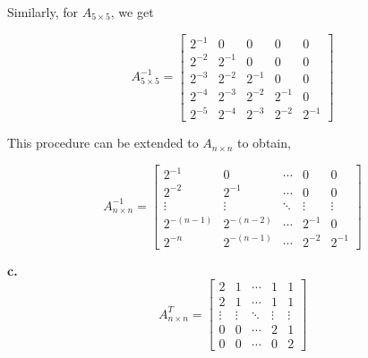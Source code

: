 \documentclass[10pt, twocolumn]{article}
\begin{document}
Similarly, for $A_{5\times 5}$, we get

\[A_{5 \times 5}^{ - 1} = \left[ {\begin{array}{*{20}{c}}
  {{2^{ - 1}}}&0&0&0&0 \\ 
  {{2^{ - 2}}}&{{2^{ - 1}}}&0&0&0 \\ 
  {{2^{ - 3}}}&{{2^{ - 2}}}&{{2^{ - 1}}}&0&0 \\ 
  {{2^{ - 4}}}&{{2^{ - 3}}}&{{2^{ - 2}}}&{{2^{ - 1}}}&0 \\ 
  {{2^{ - 5}}}&{{2^{ - 4}}}&{{2^{ - 3}}}&{{2^{ - 2}}}&{{2^{ - 1}}} 
\end{array}} \right]\]

This procedure can be extended to $A_{n\times n}$ to obtain,

\[A_{n \times n}^{ - 1} = \left[ {\begin{array}{*{20}{c}}
  {{2^{ - 1}}}&0& \cdots &0&0 \\ 
  {{2^{ - 2}}}&{{2^{ - 1}}}& \cdots &0&0 \\ 
   \vdots & \vdots & \ddots & \vdots & \vdots  \\ 
  {{2^{ - (n - 1)}}}&{{2^{ - (n - 2)}}}& \cdots &{{2^{ - 1}}}&0 \\ 
  {{2^{ - n}}}&{{2^{ - (n - 1)}}}& \cdots &{{2^{ - 2}}}&{{2^{ - 1}}} 
\end{array}} \right]\]

\textbf{c. \\[0.25cm]}
\[A_{n \times n}^T = \left[ {\begin{array}{*{20}{c}}
  2&1& \cdots &1&1 \\ 
  2&1& \cdots &1&1 \\ 
   \vdots & \vdots & \ddots & \vdots & \vdots  \\ 
  0&0& \cdots &2&1 \\ 
  0&0& \cdots &0&2 
\end{array}} \right]\]
\end{document}
